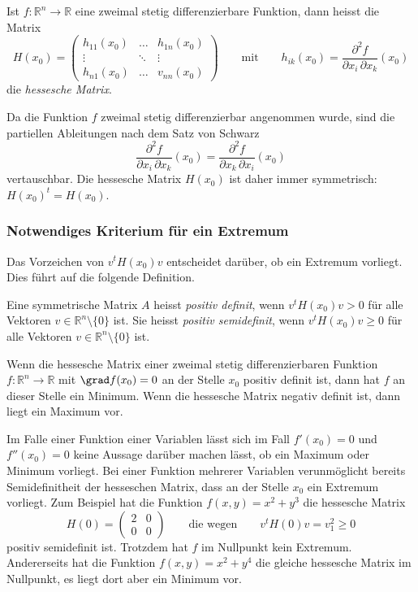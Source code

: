 \begin{definition}
Ist $f\colon\mathbb{R}^n\to\mathbb{R}$ eine zweimal stetig differenzierbare
Funktion, dann heisst die Matrix
\[
H(x_0)
=
\begin{pmatrix}
h_{11}(x_0)&\dots &h_{1n}(x_0)\\
\vdots&\ddots&\vdots\\
h_{n1}(x_0)&\dots &v_{nn}(x_0)
\end{pmatrix}
\qquad\text{mit}\qquad
h_{ik}(x_0)
=
\frac{\partial^2 f}{\partial x_i\,\partial x_k}(x_0)
\]
die {\em hessesche Matrix}.
\end{definition}

Da die Funktion $f$ zweimal stetig differenzierbar angenommen wurde,
sind die partiellen Ableitungen nach dem Satz von Schwarz
\[
\frac{\partial^2 f}{\partial x_i\,\partial x_k}(x_0)
=
\frac{\partial^2 f}{\partial x_k\,\partial x_i}(x_0)
\]
vertauschbar.
Die hessesche Matrix $H(x_0)$ ist daher immer symmetrisch: $H(x_0)^t=H(x_0)$.

%
%
\subsubsection{Notwendiges Kriterium für ein Extremum}
Das Vorzeichen von $v^tH(x_0)v$ entscheidet darüber, ob ein Extremum
vorliegt.
Dies führt auf die folgende Definition.

\begin{definition}
Eine symmetrische Matrix $A$ heisst {\em positiv definit}, wenn 
%
%
$v^tH(x_0)v>0$ für alle Vektoren $v\in\mathbb{R}^n\setminus\{0\}$ ist.
Sie heisst {\em positiv semidefinit}, wenn $v^tH(x_0)v\ge 0$ für alle
Vektoren
%
%
$v\in\mathbb{R}^n\setminus\{0\}$ ist.
\end{definition}

\begin{satz}
\label{buch:fuvar:hessesche:satz:kriterium}
Wenn die hessesche Matrix einer zweimal stetig differenzierbaren
Funktion $f\colon\mathbb{R}^n\to\mathbb{R}$ mit $\grad f(x_0)=0$ 
an der Stelle $x_0$ positiv definit ist, dann hat $f$ an dieser
Stelle ein Minimum.
Wenn die hessesche Matrix negativ definit ist, dann liegt ein Maximum
vor.
\end{satz}

Im Falle einer Funktion einer Variablen lässt sich im Fall $f'(x_0)=0$
und $f''(x_0)=0$ keine Aussage darüber machen lässt, ob ein Maximum 
oder Minimum vorliegt.
Bei einer Funktion mehrerer Variablen verunmöglicht bereits Semidefinitheit
der hesseschen Matrix, dass an der Stelle $x_0$ ein Extremum vorliegt.
Zum Beispiel hat die Funktion $f(x,y)=x^2+y^3$ die hessesche Matrix
\[
H(0)
=
\begin{pmatrix}
2&0\\
0&0
\end{pmatrix}
\qquad\text{die wegen}\qquad
v^tH(0)v = v_1^2 \ge 0
\]
positiv semidefinit ist.
Trotzdem hat $f$ im Nullpunkt kein Extremum.
Andererseits hat die Funktion $f(x,y)=x^2+y^4$ die gleiche hessesche
Matrix im Nullpunkt, es liegt dort aber ein Minimum vor.


